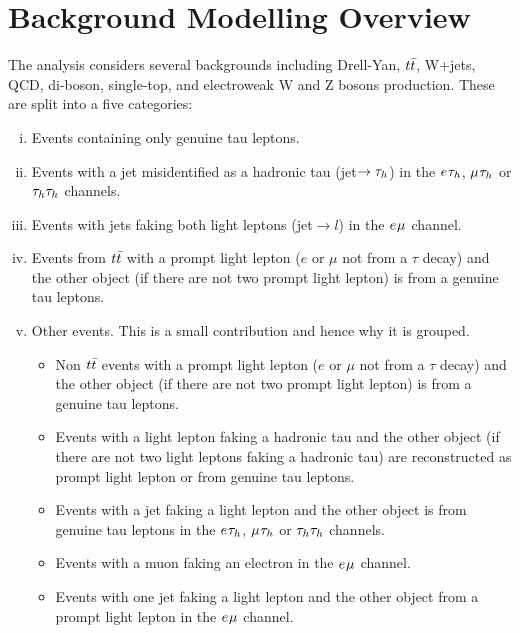 \section{Background Modelling Overview}
\label{sec:background_modelling}

The analysis considers several backgrounds including Drell-Yan, $t\bar{t}$, W+jets, QCD, di-boson, single-top, and electroweak W and Z bosons production.
These are split into a five categories:
\begin{enumerate}[i)]
  \item Events containing only genuine tau leptons.
  \item Events with a jet misidentified as a hadronic tau (jet$\rightarrow \tau_{h}$) in the $e_{}\tau_{h}$, $\mu_{}\tau_{h}$ or $\tau_{h}\tau_{h}$ channels.
  \item Events with jets faking both light leptons (jet$\rightarrow l$) in the $e_{}\mu_{}$ channel.
  \item Events from $t\bar{t}$ with a prompt light lepton ($e$ or $\mu$ not from a $\tau$ decay) and the other object (if there are not two prompt light lepton) is from a genuine tau leptons.
  \item Other events. This is a small contribution and hence why it is grouped.
  \begin{itemize}
    \item Non $t\bar{t}$ events with a prompt light lepton ($e$ or $\mu$ not from a $\tau$ decay) and the other object (if there are not two prompt light lepton) is from a genuine tau leptons.
    \item Events with a light lepton faking a hadronic tau and the other object (if there are not two light leptons faking a hadronic tau) are reconstructed as prompt light lepton or from genuine tau leptons. 
    \item Events with a jet faking a light lepton and the other object is from genuine tau leptons in the $e_{}\tau_{h}$, $\mu_{}\tau_{h}$ or $\tau_{h}\tau_{h}$ channels.
    \item Events with a muon faking an electron in the $e_{}\mu_{}$ channel.
    \item Events with one jet faking a light lepton and the other object from a prompt light lepton in the $e_{}\mu_{}$ channel.
   \end{itemize}
\end{enumerate}

